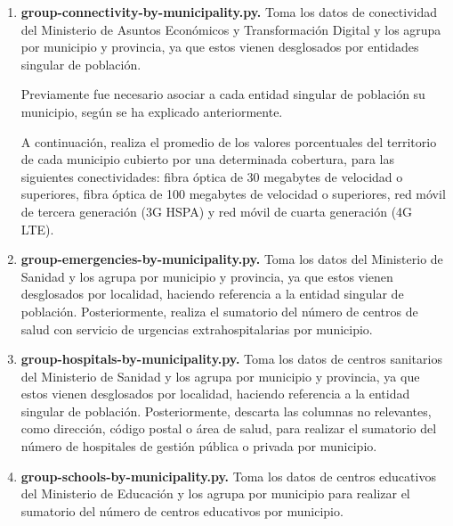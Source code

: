\begin{enumerate}
    \item \textbf{group-connectivity-by-municipality.py.} Toma los datos de conectividad del Ministerio de Asuntos Económicos y Transformación Digital y los agrupa por municipio y provincia, ya que estos vienen desglosados por entidades singular de población.

    
    Previamente fue necesario asociar a cada entidad singular de población su municipio, según se ha explicado anteriormente.

    
    A continuación, realiza el promedio de los valores porcentuales del territorio de cada municipio cubierto por una determinada cobertura, para las siguientes conectividades: fibra óptica de 30 megabytes de velocidad o superiores, fibra óptica de 100 megabytes de velocidad o superiores, red móvil de tercera generación (3G HSPA) y red móvil de cuarta generación (4G LTE).

    \item \textbf{group-emergencies-by-municipality.py.} Toma los datos del Ministerio de Sanidad y los agrupa por municipio y provincia, ya que estos vienen desglosados por localidad, haciendo referencia a la entidad singular de población. Posteriormente, realiza el sumatorio del número de centros de salud con servicio de urgencias extrahospitalarias por municipio.

    \item \textbf{group-hospitals-by-municipality.py.} Toma los datos de centros sanitarios del Ministerio de Sanidad y los agrupa por municipio y provincia, ya que estos vienen desglosados por localidad, haciendo referencia a la entidad singular de población. Posteriormente, descarta las columnas no relevantes, como dirección, código postal o área de salud, para realizar el sumatorio del número de hospitales de gestión pública o privada por municipio.
    
    \item \textbf{group-schools-by-municipality.py.} Toma los datos de centros educativos del Ministerio de Educación y los agrupa por municipio para realizar el sumatorio del número de centros educativos por municipio.
    

\end{enumerate}
